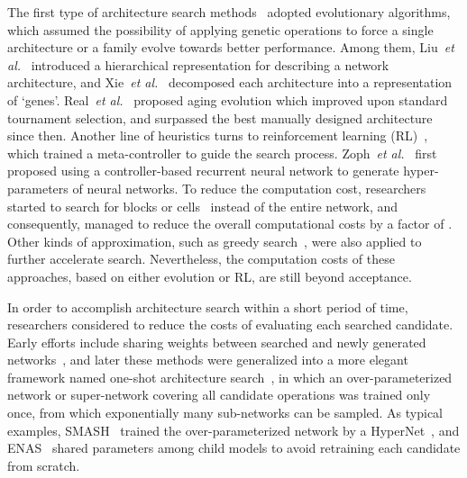 \documentclass{article} \usepackage{iclr2020_conference,times}
\begin{document}
The first type of architecture search methods~\citep{liu2017hierarchical,xie2017genetic,real2017large,elsken2018efficient,real2018regularized,miikkulainen2019evolving} adopted evolutionary algorithms, which assumed the possibility of applying genetic operations to force a single architecture or a family evolve towards better performance. Among them, Liu~\textit{et al.}~\citep{liu2017hierarchical} introduced a hierarchical representation for describing a network architecture, and Xie~\textit{et al.}~\citep{xie2017genetic} decomposed each architecture into a representation of `genes'. Real~\textit{et al.}~\citep{real2018regularized} proposed aging evolution which improved upon standard tournament selection, and surpassed the best manually designed architecture since then. Another line of heuristics turns to reinforcement learning (RL)~\citep{zoph2016neural,baker2016designing,zoph2018learning,zhong2018practical,liu2018progressive}, which trained a meta-controller to guide the search process. Zoph~\textit{et al.}~\citep{zoph2016neural} first proposed using a controller-based recurrent neural network to generate hyper-parameters of neural networks. To reduce the computation cost, researchers started to search for blocks or cells~\citep{zhong2018practical,zoph2018learning} instead of the entire network, and consequently, managed to reduce the overall computational costs by a factor of . Other kinds of approximation, such as greedy search~\citep{liu2018progressive}, were also applied to further accelerate search. Nevertheless, the computation costs of these approaches, based on either evolution or RL, are still beyond acceptance.

In order to accomplish architecture search within a short period of time, researchers considered to reduce the costs of evaluating each searched candidate. Early efforts include sharing weights between searched and newly generated networks~\citep{cai2018efficient}, and later these methods were generalized into a more elegant framework named one-shot architecture search~\citep{brock2017smash,cai2018proxylessnas,liu2018darts,pham2018efficient,xie2018snas}, in which an over-parameterized network or super-network covering all candidate operations was trained only once, from which exponentially many sub-networks can be sampled. As typical examples, SMASH~\citep{brock2017smash} trained the over-parameterized network by a HyperNet~\citep{ha2016hypernetworks}, and ENAS~\citep{pham2018efficient} shared parameters among child models to avoid retraining each candidate from scratch.
\end{document}
